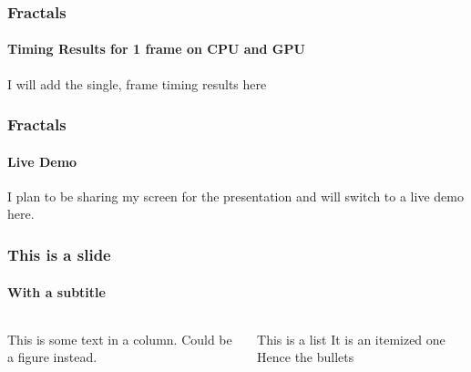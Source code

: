 \documentclass[aspectratio=169]{beamer}
\begin{document}
\begin{frame}
	\frametitle{Fractals}
	\framesubtitle{Timing Results for 1 frame on CPU and GPU}

    I will add the single, frame timing results here
\end{frame}

\begin{frame}
	\frametitle{Fractals}
	\framesubtitle{Live Demo}

    I plan to be sharing my screen for the presentation and will switch to a live demo here.
\end{frame}

\begin{frame}
	\frametitle{This is a slide}
	\framesubtitle{With a subtitle}

	\begin{columns}
		\begin{column}{0.6\textwidth}
			This is some text in a column. Could be a figure instead.
		\end{column}
		\begin{column}{0.4\textwidth}
			\begin{outline}[itemize]
				\1
				This is a list
				\1
				It is an itemized one
				\1
				Hence the bullets
			\end{outline}
		\end{column}
	\end{columns}
\end{frame}

%     
% 
% 
\end{document}

